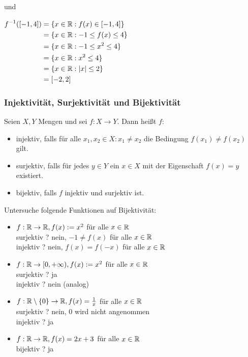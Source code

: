 \begin{bsp}
und

		$ \begin{aligned}[t]
			f^{-1}( [-1,4] ) &= \{ x \in \mathbb R : f(x) \in [-1,4] \} \\
			&= \{ x \in \mathbb R : -1 \leq f(x) \leq 4 \} \\
			&= \{ x \in \mathbb R : -1 \leq x^2 \leq 4 \} \\
			&= \{ x \in \mathbb R : x^2 \leq 4 \} \\
			&= \{ x \in \mathbb R : |x| \leq 2 \} \\
			&= [-2,2]
		\end{aligned} $
\end{bsp}


\subsubsection{Injektivität, Surjektivität und Bijektivität}

Seien $ X,Y $ Mengen und sei $ f : X \to Y $. Dann heißt $ f $:
\begin{itemize}
	\item injektiv, falls für alle $ x_1, x_2 \in X : x_1 \neq x_2 $ die Bedingung $ f(x_1) \neq f(x_2) $ gilt.
	\item surjektiv, falls für jedes $ y \in Y $ ein $ x \in X $ mit der Eigenschaft $ f(x) = y $ existiert.
	\item bijektiv, falls $ f $ injektiv und surjektiv ist.
\end{itemize}

\begin{bsp}
	Untersuche folgende Funktionen auf Bijektivität:
	\begin{itemize}
		\item $ f : \mathbb R \to \mathbb R, f(x) := x^2 $ für alle $ x \in \mathbb R $\\
		surjektiv ? nein, $ -1 \neq f(x) $ für alle $ x \in \mathbb R $\\
		injektiv ? nein, $ f(x) = f(-x) $ für alle $ x \in \mathbb R $
		\item $ f : \mathbb R \to [0,+\infty), f(x) := x^2 $ für alle $ x \in \mathbb R $\\
		surjektiv ? ja\\
		injektiv ? nein (analog)
		\item $ f : \mathbb R \setminus \{ 0 \} \to \mathbb R, f(x) = \frac{1}{x} $ für alle $ x \in \mathbb R $\\
		surjektiv ? nein, 0 wird nicht angenommen\\
		injektiv ? ja
		\item $ f : \mathbb R \to \mathbb R, f(x) = 2x + 3 $ für alle $ x \in \mathbb R $\\
		bijektiv ? ja
	\end{itemize}
\end{bsp}

